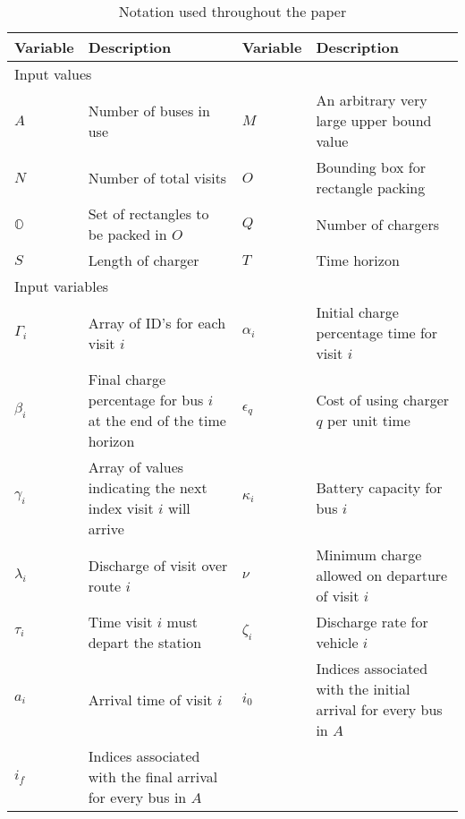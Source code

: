 \begin{table*}[!t]
	\caption{Notation used throughout the paper}
	\label{tab:variables}
	\centering
	\begin{tabular}{l l l l}
		\toprule
		\textbf{Variable} & \textbf{Description} & \textbf{Variable} & \textbf{Description} \\
		\toprule
		\multicolumn{4}{l}{Input values}                                  \\
			$A$           & Number of buses in use                    &
			$M$           & An arbitrary very large upper bound value \\
			$N$           & Number of total visits                    &
			$O$           & Bounding box for rectangle packing        \\
			$\mathbb{O}$ & Set of rectangles to be packed in $O$     &
			$Q$           & Number of chargers                        \\
			$S$           & Length of charger                         &
			$T$           & Time horizon                              \\
		\hline
		\multicolumn{4}{l}{Input variables} \\
			$\Gamma_i$   & Array of ID's for each visit $i$                                   &
			$\alpha_i$   & Initial charge percentage time for visit $i$                       \\
			$\beta_i$    & Final charge percentage for bus $i$ at the end of the time horizon &
			$\epsilon_q$ & Cost of using charger $q$ per unit time                            \\
			$\gamma_i$   & Array of values indicating the next index visit $i$ will arrive    &
			$\kappa_i$   & Battery capacity for bus $i$                                       \\
			$\lambda_i$  & Discharge of visit over route $i$                                  &
			$\nu$        & Minimum charge allowed on departure of visit $i$                   \\
			$\tau_i$     & Time visit $i$ must depart the station                             &
			$\zeta_i$    & Discharge rate for vehicle $i$                                     \\
			$a_i$        & Arrival time of visit  $i$                                         &
			$i_0$        & Indices associated with the initial arrival for every bus in $A$   \\
			$i_f$        & Indices associated with the final arrival for every bus in $A$     &

\end{tabular}
\end{table*}
